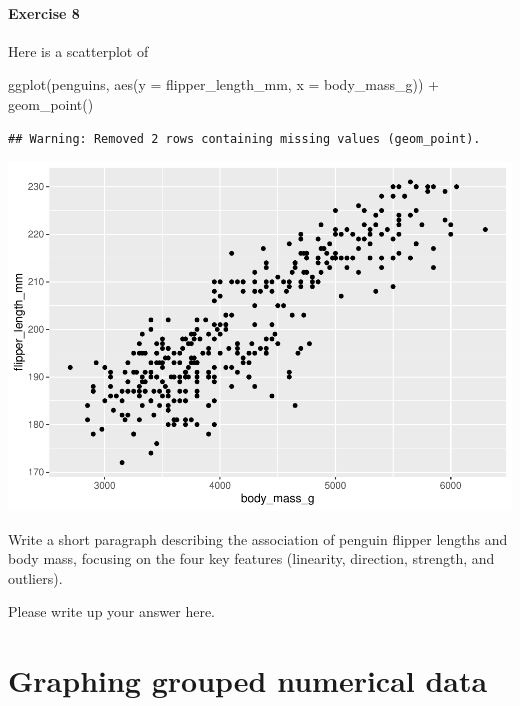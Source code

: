 \documentclass[
]{book}
\newenvironment{Shaded}{\begin{snugshade}}{\end{snugshade}}
\newcommand{\AttributeTok}[1]{\textcolor[rgb]{0.77,0.63,0.00}{#1}}
\newcommand{\FunctionTok}[1]{\textcolor[rgb]{0.00,0.00,0.00}{#1}}
\newcommand{\NormalTok}[1]{#1}
\newcommand{\SpecialCharTok}[1]{\textcolor[rgb]{0.00,0.00,0.00}{#1}}
\begin{document}
\hypertarget{exercise-8}{%
\paragraph*{Exercise 8}\label{exercise-8}}

Here is a scatterplot of

\begin{Shaded}
\begin{Highlighting}[]
\FunctionTok{ggplot}\NormalTok{(penguins, }\FunctionTok{aes}\NormalTok{(}\AttributeTok{y =}\NormalTok{ flipper\_length\_mm, }\AttributeTok{x =}\NormalTok{ body\_mass\_g)) }\SpecialCharTok{+}
    \FunctionTok{geom\_point}\NormalTok{()}
\end{Highlighting}
\end{Shaded}

\begin{verbatim}
## Warning: Removed 2 rows containing missing values (geom_point).
\end{verbatim}

\includegraphics{intro_stats_files/figure-latex/unnamed-chunk-106-1.pdf}

Write a short paragraph describing the association of penguin flipper lengths and body mass, focusing on the four key features (linearity, direction, strength, and outliers).

Please write up your answer here.

\hypertarget{numerical-graphing-grouped}{%
\section{Graphing grouped numerical data}\label{numerical-graphing-grouped}}
\end{document}
